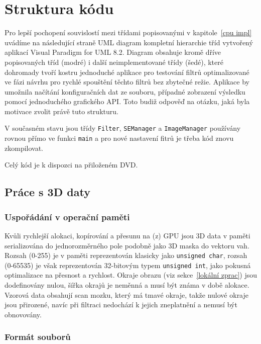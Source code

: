 
\chapter{Struktura kódu}\label{struktura kódu}

    Pro lepší pochopení souvislostí mezi třídami popisovanými v kapitole~\ref{cpu impl} uvádíme na následující straně UML diagram kompletní hierarchie tříd vytvořený aplikací Visual Paradigm for UML 8.2. Diagram obsahuje kromě dříve popisovaných tříd (modré) i další neimplementované třídy (šedé), které dohromady tvoří kostru jednoduché aplikace pro testování filtrů optimalizované ve fázi návrhu pro rychlé spouštění těchto filtrů bez zbytečné režie. Aplikace by umožnila načítání konfiguračních dat ze souboru, případné zobrazení výsledku pomocí jednoduchého grafického API. Toto budiž odpověď na otázku, jaká byla motivace zvolit právě tuto strukturu.

    V současném stavu jsou třídy {\tt Filter}, {\tt SEManager} a {\tt ImageManager} používány rovnou přímo ve funkci {\tt main} a pro nové nastavení fitrů je třeba kód znovu zkompilovat.
    
    Celý kód je k dispozci na přiloženém DVD.

    \section{Práce s 3D daty}

        \subsection{Uspořádání v operační paměti}

        Kvůli rychlejší alokaci, kopírování a přesunu na (z) GPU jsou 3D data v paměti serializována do jednorozměrného pole podobně jako 3D maska do vektoru vah. Rozsah (0-255) je v paměti reprezentován klasicky jako {\tt unsigned char}, rozsah (0-65535) je však reprezentován 32-bitovým typem {\tt unsigned int}, jako pokusná optimalizace na přesnost a rychlost. Okraje obrazu (viz sekce~\ref{lokální zprac}) jsou dodefinovány nulou, šířka okrajů je neměnná a musí být známa v době alokace. Vzorová data obsahují scan mozku, který má tmavé okraje, takže nulové okraje jsou přirozené, navíc při filtraci nedochází k jejich zneplatnění a nemusí být obnovovány.

        \subsection{Formát souborů}

